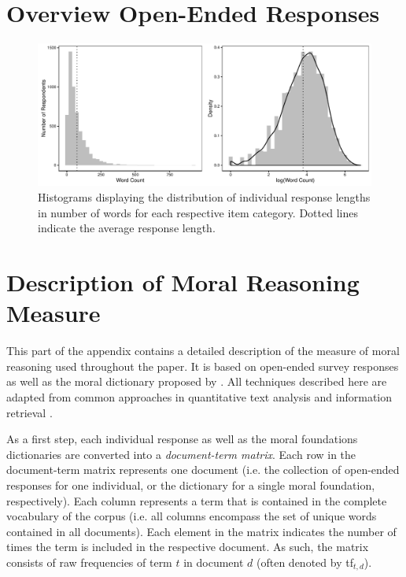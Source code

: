 \documentclass[12pt]{article}
\begin{document}
\clearpage
\section{Overview Open-Ended Responses}\label{app:oview}
\renewcommand\thefigure{\thesection.\arabic{figure}}
\renewcommand\thetable{\thesection.\arabic{table}}
\setcounter{figure}{0}
\setcounter{table}{0}



\begin{figure}[h]\centering
\includegraphics{../calc/fig/app_wc.pdf}
\caption{Histograms displaying the distribution of individual response lengths in number of words for each respective item category. Dotted lines indicate the average response length.}\label{fig:appB2num}
\end{figure}

\clearpage
\section{Description of Moral Reasoning Measure}\label{app:measure}

This part of the appendix contains a detailed description of the measure of moral reasoning used throughout the paper. It is based on open-ended survey responses as well as the moral dictionary proposed by \citet{graham2009liberals}. All techniques described here are adapted from common approaches in quantitative text analysis and information retrieval \citep[see for exampe][for an introduction and from which much of the notation in this part of the appendix is adapted]{manning2008introduction}.

As a first step, each individual response as well as the moral foundations dictionaries are converted into a \textit{document-term matrix}. Each row in the document-term matrix represents one document (i.e. the collection of open-ended responses for one individual, or the dictionary for a single moral foundation, respectively). Each column represents a term that is contained in the complete vocabulary of the corpus (i.e. all columns encompass the set of unique words contained in all documents). Each element in the matrix indicates the number of times the term is included in the respective document. As such, the matrix consists of raw frequencies of term $t$ in document $d$ (often denoted by tf$_{t,d}$).
\end{document}
